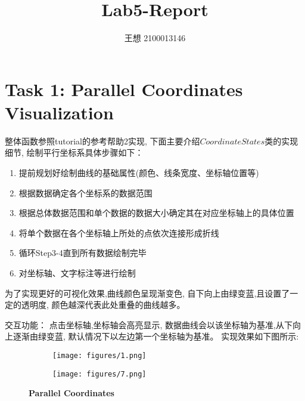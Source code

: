 \documentclass{ctexart}
\title{Lab5-Report}
\author{王想 2100013146}
\date{}
\begin{document}
\maketitle

\section{Task 1: Parallel Coordinates Visualization}
整体函数参照tutorial的参考帮助2实现,
下面主要介绍$CoordinateStates$类的实现细节,
绘制平行坐标系具体步骤如下：
\begin{enumerate}
    \item 提前规划好绘制曲线的基础属性(颜色、线条宽度、坐标轴位置等)
    \item 根据数据确定各个坐标系的数据范围
    \item 根据总体数据范围和单个数据的数据大小确定其在对应坐标轴上的具体位置
    \item 将单个数据在各个坐标轴上所处的点依次连接形成折线
    \item 循环Step3-4直到所有数据绘制完毕
    \item 对坐标轴、文字标注等进行绘制
\end{enumerate}
为了实现更好的可视化效果,曲线颜色呈现渐变色,
自下向上由绿变蓝,且设置了一定的透明度,
颜色越深代表此处重叠的曲线越多。

交互功能：
点击坐标轴,坐标轴会高亮显示,
数据曲线会以该坐标轴为基准,从下向上逐渐由绿变蓝,
默认情况下以左边第一个坐标轴为基准。
实现效果如下图所示:

\begin{figure}[htbp]
    \centering
    \begin{subfigure}[htbp]{0.4\linewidth}
        \centering
        \texttt{[image: figures/1.png]}
    \end{subfigure}
    \begin{subfigure}[htbp]{0.4\linewidth}
        \centering
        \texttt{[image: figures/7.png]}
    \end{subfigure}
    \caption{\textbf{Parallel Coordinates}}
\end{figure}
\end{document}
